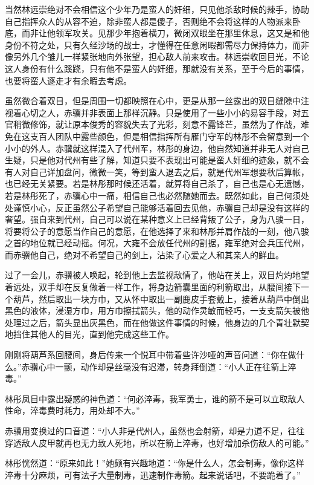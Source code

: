 当然林远崇绝对不会相信这个少年乃是蛮人的奸细，只见他杀敌时候的辣手，协助自己指挥众人的从容不迫，除非蛮人都是傻子，否则绝不会将这样的人物派来卧底，而非让他领军攻关。见那少年抱着横刀，微闭双眼坐在那里休息，这又是和他身份不符之处，只有久经沙场的战士，才懂得在任意闲暇都需尽力保持体力，而非像另外几个雏儿一样紧张地向外张望，担心敌人前来攻击。林远崇收回目光，不论这人身份有什么蹊跷，只有他不是蛮人的奸细，那就没有关系，至于今后的事情，也要将蛮人逐走才有余暇去考虑。

虽然微合着双目，但是周围一切都映照在心中，更是从那一丝露出的双目缝隙中注视着心切之人，赤骥并非表面上那样沉静。只是使用了一些小小的易容手段，对五官稍微修饰，就让原本俊秀的容貌失去了光彩，刻意不露锋芒，虽然为了作战，难免在这支百人团队中露些颜色，但是相信指挥所有雁门守军的林彤不会留意到一个小小的外人。赤骥就这样混入了代州军，林彤的身边，他自然知道并非无人对自己生疑，只是他对代州有些了解，知道只要不表现出可能是蛮人奸细的迹象，就不会有人对自己详加盘问，微微一笑，等到蛮人退去之后，就是代州军想要秋后算帐，也已经无关紧要。若是林彤那时候还活着，就算将自己杀了，自己也是心无遗憾，若是林彤死了，赤骥心中一痛，相信自己也必然随她而去。既然如此，自己何须处处谨慎小心，反正虽然公子希望自己能够活着回去见他，赤骥自己却是没有这样的奢望。强自来到代州，自己可以说在某种意义上已经背叛了公子，身为八骏一日，将要将公子的意愿当作自己的意愿，在他选择了来和林彤并肩作战的一刻，他八骏之首的地位就已经动摇。何况，大雍不会放任代州的割据，雍军绝对会兵压代州，而赤骥他自己，绝对不希望自己的剑上，沾染了心爱之人和其亲人的鲜血。

过了一会儿，赤骥被人唤起，轮到他上去监视敌情了，他站在关上，双目灼灼地望着远处，双手却在反复做着一样工作，将身边箭囊里面的利箭取出，从腰间接下一个葫芦，然后取出一块方巾，又从怀中取出一副鹿皮手套戴上，接着从葫芦中倒出黑色的液体，浸湿方巾，用方巾擦拭箭头，他的动作灵敏而轻巧，一支支箭矢被他处理过之后，箭头显出灰黑色，而在他做这件事情的时候，他身边的几个青壮默契地挡住其他人的目光，直到他完成这些工作。

刚刚将葫芦系回腰间，身后传来一个悦耳中带着些许沙哑的声音问道：“你在做什么。”赤骥心中一颤，动作却是丝毫没有迟滞，转身拜倒道：“小人正在往箭上淬毒。”

林彤凤目中露出疑惑的神色道：“何必淬毒，我军勇士，谁的箭不是可以立取敌人性命，淬毒费时耗力，用处却不大。”

赤骥用变换过的口音道：“小人非是代州人，虽然也会射箭，却是力道不足，往往穿透敌人皮甲就再也无力致人死地，所以在箭上淬毒，也好增加杀伤敌人的可能。”

林彤恍然道：“原来如此！”她颇有兴趣地道：“你是什么人，怎会制毒，像你这样淬毒十分麻烦，可有法子大量制毒，迅速制作毒箭。起来说话吧，不要跪着了。”

